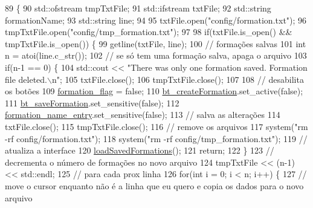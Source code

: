 \begin{DoxyCode}
89                                                     \{
90     std::ofstream tmpTxtFile;
91     std::ifstream txtFile;
92     std::string formationName;
93     std::string line;
94 
95     txtFile.open(\textcolor{stringliteral}{"config/formation.txt"});
96     tmpTxtFile.open(\textcolor{stringliteral}{"config/tmp\_formation.txt"});
97 
98     \textcolor{keywordflow}{if}(txtFile.is\_open() && tmpTxtFile.is\_open()) \{
99         getline(txtFile, line);
100         \textcolor{comment}{// formações salvas}
101         \textcolor{keywordtype}{int} n = atoi(line.c\_str());
102         \textcolor{comment}{// se só tem uma formação salva, apaga o arquivo}
103         \textcolor{keywordflow}{if}(n-1 == 0) \{
104             std::cout << \textcolor{stringliteral}{"There was only one formation saved. Formation file deleted.\(\backslash\)n"};
105             txtFile.close();
106             tmpTxtFile.close();
107 
108             \textcolor{comment}{// desabilita os botões}
109             \hyperlink{class_strategy_g_u_i_aaac145125516fb8b7fe7137db18cdb58}{formation\_flag} = \textcolor{keyword}{false};
110             \hyperlink{class_strategy_g_u_i_ab6edc11fb98709c98ad1815998aa937a}{bt\_createFormation}.set\_active(\textcolor{keyword}{false});
111             \hyperlink{class_strategy_g_u_i_ae68d7475f55a82e46d74eb8b3cd53b9e}{bt\_saveFormation}.set\_sensitive(\textcolor{keyword}{false});
112             \hyperlink{class_strategy_g_u_i_a19406b76eaf73c06545aa1c67c0636ce}{formation\_name\_entry}.set\_sensitive(\textcolor{keyword}{false});
113             \textcolor{comment}{// salva as alterações}
114             txtFile.close();
115             tmpTxtFile.close();
116             \textcolor{comment}{// remove os arquivos}
117             system(\textcolor{stringliteral}{"rm -rf config/formation.txt"});
118             system(\textcolor{stringliteral}{"rm -rf config/tmp\_formation.txt"});
119             \textcolor{comment}{// atualiza a interface}
120             \hyperlink{class_strategy_g_u_i_a616a0f321878532cf85cfd02564758b5}{loadSavedFormations}();
121             \textcolor{keywordflow}{return};
122         \}
123         \textcolor{comment}{// decrementa o número de formações no novo arquivo}
124         tmpTxtFile << (n-1) << std::endl;
125         \textcolor{comment}{// para cada prox linha}
126         \textcolor{keywordflow}{for}(\textcolor{keywordtype}{int} i = 0; i < n; i++) \{
127             \textcolor{comment}{// move o cursor enquanto não é a linha que eu quero e copia os dados para o novo arquivo}

\end{DoxyCode}
